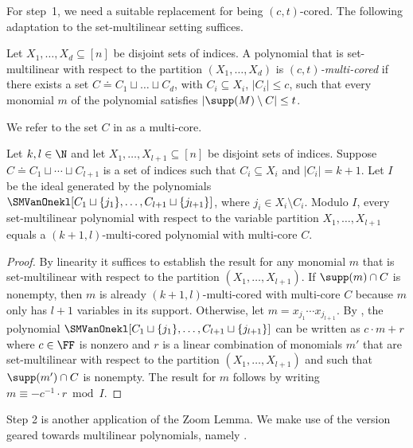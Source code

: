 For step~1, we need a suitable replacement for being \((c,t)\)-cored.
The following adaptation to the set-multilinear setting
suffices.
\begin{definition}
  \label{def.smcored}
  Let \(X_1, \dots, X_d \subseteq [n]\) be disjoint sets of
  indices.
  A polynomial that is
  set-multilinear with respect to the partition $(X_1, \dots, X_d)$ is
  \emph{\((c,t)\)-multi-cored} if
  there exists a set $C\doteq C_1\sqcup\dots\sqcup C_d$, with $C_i\subseteq X_i$, $|C_i|\le c$,
  such that every monomial $m$ of the polynomial satisfies $|\supp(M)\setminus C|\le t$.
\end{definition}

We refer to the set $C$ in  as a multi-core.

\begin{lemma}
    \label{lemma.smvanone-multicoredform}
    Let $k,l\in\N$ and let $X_1, \dots, X_{l+1}\subseteq [n]$
    be disjoint sets of indices. Suppose $C\doteq C_1\sqcup\cdots\sqcup C_{l+1}$ is a set of indices
    such that $C_i\subseteq X_i$ and $|C_i| = k+1$. Let $I$ be the ideal generated by
    the polynomials $\SMVanOnekl[C_1\sqcup \{j_1\},\dots,C_{l+1}\sqcup \{j_{l+1}\}]$, 
    where $j_i\in X_i\setminus C_i$. Modulo $I$, every set-multilinear polynomial with respect to the variable partition
    \(X_1, \dots,X_{l+1}\) equals a \((k+1,l)\)-multi-cored polynomial with multi-core $C$.
\end{lemma}

\begin{proof}
    By linearity it suffices to establish the result for any 
    monomial $m$ that is set-multilinear with respect to the partition $(X_1, \dots, X_{l+1})$. 
    If $\supp(m) \cap C$ is nonempty, then $m$ is already $(k+1,l)$-multi-cored with multi-core $C$ because $m$ only has $l+1$ variables in its support. Otherwise, let $m=x_{j_1}\cdots x_{j_{l+1}}$. By , the polynomial $\SMVanOnekl[C_1\sqcup\{j_1\},\dots, C_{l+1}\sqcup\{j_{l+1}\}]$ can be written as $c \cdot m + r$ where $c \in \FF$ is nonzero and $r$ is a linear combination of monomials $m'$ that are set-multilinear with respect to the partition $(X_1, \dots, X_{l+1})$ and such that $\supp(m') \cap C$ is nonempty. The result for $m$ follows by writing $m \equiv -c^{-1} \cdot r \bmod I$.
\end{proof}

Step 2 is another application of the Zoom Lemma. We make use of the version geared towards multilinear polynomials, namely .

